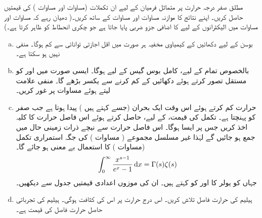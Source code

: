 مطلق صفر درجہ حرارت پر متماثل فرميان کے لیے ان تکملات (مساوات  اور مساوات  ) کی قیمتیں حاصل کریں۔ اپنے نتائج کا موازنہ مساوات  اور مساوات  کے ساتھ کریں۔( دھیان رہے کہ مساوات  اور مساوات  میں الیکٹرانوں کے لیے  کا اضافی جزو ضربی پایا جاتا ہے جو چکری انحطاط کو ظاہر کرتا ہے۔)
\begin{enumerate}[a.]
\item
بوسن کے لیے دکھائیں کے کیمیاوی مخفیہ ہر صورت میں اقل اجازتی توانائی سے کم ہوگا۔   منفی نہیں ہو سکتا ہے۔ 
\item
بالخصوص تمام  کے لیے، کامل بوس گیس کے لیے  ہوگا۔ ایسی صورت میں  اور  کو مستقل تصور کرتے ہوئے دکھائیں کے  کم کرنے سے  یکسر بڑھے گا۔  منفی علامت لیتے ہوئے مساوات  پر غور کریں۔
\item
حرارت  کم کرتے ہوئے اس وقت ایک بحران (جسے  کہتے ہیں ) پیدا ہوتا ہے جب  صفر کو پہنچتا ہے۔ تکمل کی قیمت،  کے لیے، حاصل کرتے ہوئے اس فاصل حرارت کا کلیہ اخذ کریں جس پر ایسا ہوگا۔ اس فاصل حرارت سے نیچے ذرات زمینی حال میں جمع ہو جائیں گے لہٰذا غیر مسلسل مجموعے ( مساوات ) کی جگہ استمراری تکمل (مساوات ) کا استعمال بے معنی ہو جائے گا۔  
\begin{align}\label{مساوات_متماثل_گاما_زیٹا}
\int_0^{\infty} \frac{x^{s - 1}}{e^x - 1} \dif x = \Gamma (s) \zeta(s)
\end{align} 
جہاں  کو یولر کا  اور  کو  کہتے ہیں۔ ان کی موزوں اعدادی قیمتیں جدول سے دیکھیں۔ 
\item
ہیلیم  کی حرارت فاصل تلاش کریں۔ اس درج حرارت پر اس کی کثافت  ہوگی۔  ہیلیم کی تجرباتی حاصل حرارت فاصل کی قیمت  ہے۔ 
\end{enumerate}

